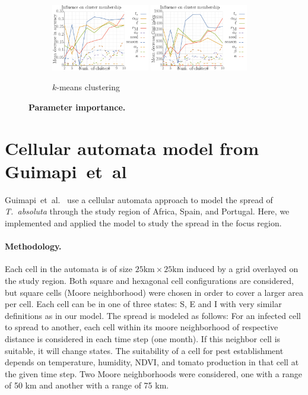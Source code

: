 \documentclass[10pt]{article}
\newcommand{\aacomment}[1]{({\color{magenta}AA: #1})}
\theoremstyle{definition}
\newcommand{\tuta}{\emph{T.~absoluta}}
\begin{document}
\begin{figure}[t]
\begin{subfigure}[b]{\textwidth}
    \includegraphics[width=0.47\textwidth]{../clustering/results/kmeans/rf_k_kmeans_mse.pdf}
    \includegraphics[width=0.47\textwidth]{../clustering/results/kmeans/rf_k_kmeans_mdg.pdf}
    \caption{$k$-means clustering\label{fig:rfA}}
\end{subfigure}
\caption{\textbf{Parameter importance.}}
\end{figure}
\section{Cellular automata model from Guimapi~et~al}
\label{sec:guimapi}
Guimapi~et~al.~\cite{guimapi2016modeling} use a cellular automata approach
to model the spread of \tuta{} through the study region of Africa, Spain, and Portugal. 
Here, we implemented and applied the model to study the spread in the focus
region.
\paragraph{Methodology.}
Each cell in the automata is of size $25\mathrm{km}\times25\mathrm{km}$ induced by a
grid overlayed on the study region. Both square and hexagonal cell
configurations are considered, but square cells (Moore neighborhood) were
chosen in order to cover a larger area per cell.
Each cell can be in one of three states: S, E and I with very similar
definitions as in our model.
The spread is modeled as follows:
For an infected cell to spread to another, each cell within its moore
neighborhood of respective distance is considered in each time step (one month). If this neighbor cell is
suitable, it will change states. The suitability of a cell for pest
establishment depends on temperature, humidity, NDVI, and tomato production
in that cell at the given time step.
Two Moore neighborhoods were
considered, one with a range of 50 km and another with a range of 75 km.
\end{document}
